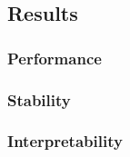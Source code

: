\subsection{Results}
\subsubsection{Performance}
\subsubsection{Stability}
\subsubsection{Interpretability}
